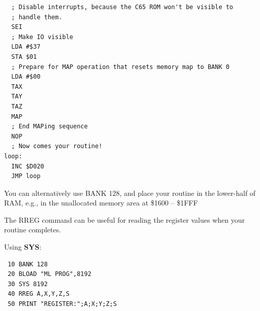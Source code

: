 \begin{description}[leftmargin=2cm,style=nextline]
\newpage
\begin{tcolorbox}[colback=black,coltext=white]
\verbatimfont{\codefont}
\begin{verbatim}
  ; Disable interrupts, because the C65 ROM won't be visible to
  ; handle them.
  SEI
  ; Make IO visible
  LDA #$37
  STA $01
  ; Prepare for MAP operation that resets memory map to BANK 0
  LDA #$00
  TAX
  TAY
  TAZ
  MAP
  ; End MAPing sequence
  NOP
  ; Now comes your routine!
loop:
  INC $D020
  JMP loop
\end{verbatim}
\end{tcolorbox}

\item [Remarks:] You can alternatively use BANK 128, and place your
  routine in the lower-half of RAM, e.g., in the unallocated memory
  area at \$1600 -- \$1FFF

\item [Remarks:] The RREG command can be useful for reading the
  register values when your routine completes.


\item [Example:] Using {\bf SYS}:
\begin{tcolorbox}[colback=black,coltext=white]
\verbatimfont{\codefont}
\begin{verbatim}
 10 BANK 128
 20 BLOAD "ML PROG",8192
 30 SYS 8192
 40 RREG A,X,Y,Z,S
 50 PRINT "REGISTER:";A;X;Y;Z;S
\end{verbatim}
\end{tcolorbox}

\end{description}


\newpage
